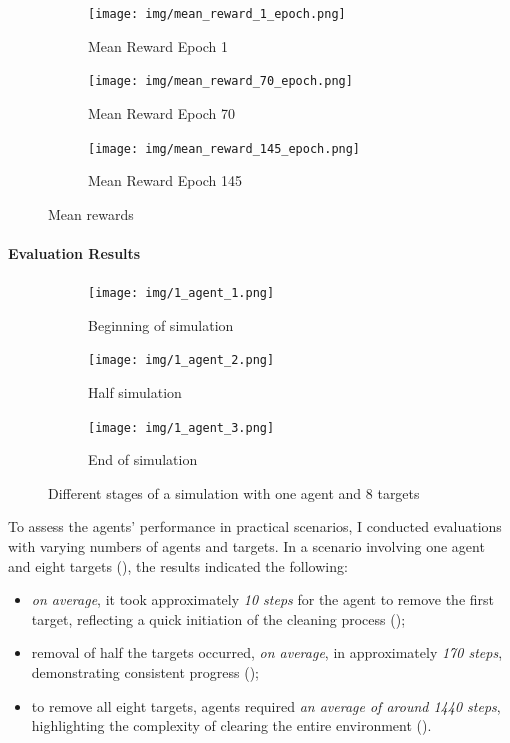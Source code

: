 \documentclass[12pt,a4paper,openright,twoside]{book}
\begin{document}
\begin{figure}
  \centering
  \begin{subfigure}[b]{0.45\textwidth}
      \centering
      \texttt{[image: img/mean\_reward\_1\_epoch.png]}
      \caption{Mean Reward Epoch 1}
      \label{fig:d}
  \end{subfigure}
  \hfill
  \begin{subfigure}[b]{0.45\textwidth}
      \centering
      \texttt{[image: img/mean\_reward\_70\_epoch.png]}
      \caption{Mean Reward Epoch 70}
      \label{fig:e}
  \end{subfigure}
  \hfill
  \begin{subfigure}[b]{0.45\textwidth}
      \centering
      \texttt{[image: img/mean\_reward\_145\_epoch.png]}
      \caption{Mean Reward Epoch 145} 
      \label{fig:f}
  \end{subfigure}
  \caption{Mean rewards}
\end{figure}

\paragraph{Evaluation Results}

\begin{figure}
  \centering
  \begin{subfigure}[b]{0.45\textwidth}
      \centering
      \texttt{[image: img/1\_agent\_1.png]}
      \caption{Beginning of simulation}
  \end{subfigure}
  \hfill
  \begin{subfigure}[b]{0.45\textwidth}
      \centering
      \texttt{[image: img/1\_agent\_2.png]}
      \caption{Half simulation}
  \end{subfigure}
  \hfill
  \begin{subfigure}[b]{0.45\textwidth}
      \centering
      \texttt{[image: img/1\_agent\_3.png]}
      \caption{End of simulation} 
  \end{subfigure}
  \caption{Different stages of a simulation with one agent and 8 targets}
  \label{fig:m}
\end{figure}

To assess the agents' performance in practical scenarios, I conducted evaluations with varying numbers of agents and targets. In a scenario involving one agent and eight targets (), the results indicated the following:
\begin{itemize}
  \item \emph{on average}, it took approximately \emph{10 steps} for the agent to remove the first target, reflecting a quick initiation of the cleaning process ();
  \item removal of half the targets occurred, \emph{on average}, in approximately \emph{170 steps}, demonstrating consistent progress ();
  \item to remove all eight targets, agents required \emph{an average of around 1440 steps}, highlighting the complexity of clearing the entire environment ().
\end{itemize}
\end{document}
